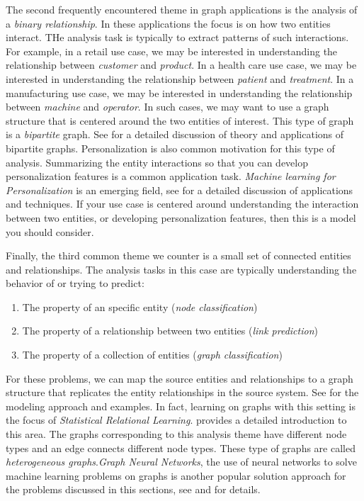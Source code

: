\documentclass{article}
\begin{document}
The second frequently encountered theme in graph applications is the analysis of a \emph{binary relationship}. In these applications the focus is on how two entities interact. THe analysis task is typically to extract patterns of such interactions. For example, in a retail use case, we may be interested in understanding the relationship between \emph{customer} and \emph{product}. In a health care use case, we may be interested in understanding the relationship between \emph{patient} and \emph{treatment}. In a manufacturing use case, we may be interested in understanding the relationship between \emph{machine} and \emph{operator}. In such cases, we may want to use a graph structure that is centered around the two entities of interest. This type of graph is a \emph{bipartite} graph. See \cite{kunegis2015exploiting} for a detailed discussion of theory and applications of bipartite graphs. Personalization is also common motivation for this type of analysis. Summarizing the entity interactions so that you can develop personalization features is a common application task. \emph{Machine learning for Personalization} is an emerging field, see \cite{mcauley2022personalized} for a detailed discussion of applications and techniques. If your use case is centered around understanding the interaction between two entities, or developing personalization features, then this is a model you should consider.

Finally, the third common theme we counter is a small set of connected entities and relationships. The analysis tasks in this case are typically understanding the behavior of or trying to predict:

\begin{enumerate}
    \item The property of an specific entity (\emph{node classification})
    \item The property of a relationship between two entities (\emph{link prediction})
    \item The property of a collection of entities (\emph{graph classification})
\end{enumerate}

For these problems, we can map the source entities and relationships to a graph structure that replicates the entity relationships in the source system. See \cite{schlichtkrull2018modeling} for the modeling approach and examples. In fact, learning on graphs with this setting is the focus of \emph{Statistical Relational Learning}. \cite{getoor2007introduction} provides a detailed introduction to this area. The graphs corresponding to this analysis theme have different node types and an edge connects different node types. These type of graphs are called \emph{heterogeneous graphs}.\emph{Graph Neural Networks}, the use of neural networks to solve machine learning problems on graphs is another popular solution approach for the problems discussed in this sections, see \cite{hamilton2020graph} and \cite{zhou2020graph} for details. 
\end{document}
